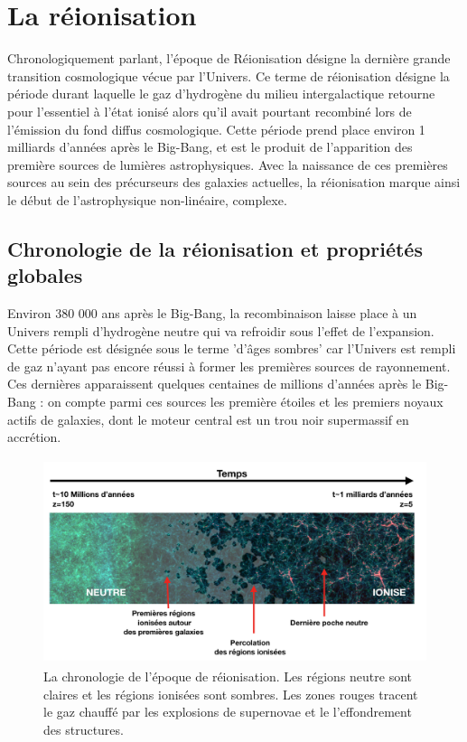 \chapter{La réionisation}

Chronologiquement parlant, l'époque de Réionisation désigne la dernière grande transition cosmologique vécue par l'Univers. Ce terme de réionisation désigne la période durant laquelle le gaz d'hydrogène du milieu intergalactique retourne pour l'essentiel à l'état ionisé alors qu'il avait pourtant recombiné lors de l'émission du fond diffus cosmologique. Cette période prend place environ 1 milliards d'années après le Big-Bang, et est le produit de l'apparition des première sources de lumières astrophysiques. Avec la naissance de ces premières sources au sein des précurseurs des galaxies actuelles, la réionisation marque ainsi le début de l'astrophysique non-linéaire, complexe.

\section{Chronologie de la réionisation et propriétés globales}
Environ 380 000 ans après le Big-Bang, la recombinaison laisse place à un Univers rempli d'hydrogène neutre qui va refroidir sous l'effet de l'expansion. Cette période est désignée sous le terme 'd'âges sombres' car l'Univers est rempli de gaz n'ayant pas encore réussi à former les premières sources de rayonnement. Ces dernières apparaissent quelques centaines de millions d'années après le Big-Bang : on compte parmi ces sources les première étoiles et les premiers noyaux actifs de galaxies, dont le moteur central est un trou noir supermassif en accrétion.

\begin{figure}[htbp]
	\centering
		\includegraphics[height=6cm]{figs/frisereion.png}
		\caption[Chronologie de la réionisation]{La chronologie de l'époque de réionisation. Les régions neutre sont claires et les régions ionisées sont sombres. Les zones rouges tracent le gaz chauffé par les explosions de supernovae et le l'effondrement des structures.}
	\label{f:frisereion}
\end{figure}

